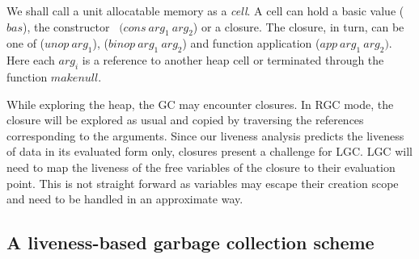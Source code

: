 \documentclass[9pt]{sigplanconf}
\begin{document}
We shall call  a unit allocatable memory as a {\em  cell}.  A cell can
hold  a  basic  value   ($\mathit{bas}$),  the  constructor  \CONS\  $(\mathit{cons~
arg_1~arg_2}$) or   a closure.  The closure, in  turn, can be  one of
($\mathit{unop~arg_1}$),  ($\mathit{ binop~arg_1~arg_2}$)  and  function  application
($\mathit{app~arg_1~arg_2})$.  Here each $\mathit{ arg_i}$ is a reference to another heap
cell or terminated through the function $\mathit{makenull}$.

While exploring the heap, the GC  may encounter closures. In RGC mode,
the closure  will be explored  as usual  and copied by  traversing the
references corresponding to the arguments. Since our liveness analysis
predicts the  liveness of  data in its  evaluated form  only, closures
present a challenge for LGC. LGC will  need to map the liveness of the
free variables of the closure to  their evaluation point.  This is not
straight  forward as  variables may  escape their  creation scope  and
need to  be handled in an  approximate way.


\subsection{A liveness-based garbage collection scheme}
\label{sec:live-clo}
  \SetStartEndCondition{ }{}{}%
  \AlgoDontDisplayBlockMarkers\SetAlgoNoEnd\SetAlgoNoLine%
\end{document}
